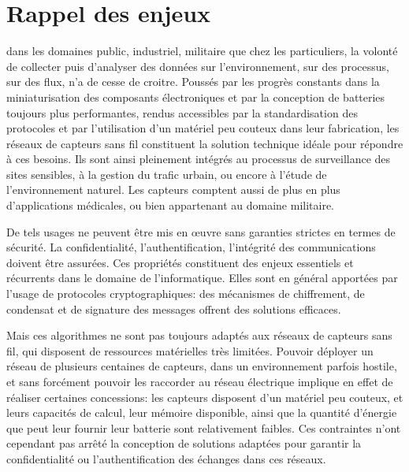 \section{Rappel des enjeux}

 dans les domaines public, industriel, militaire que chez les particuliers, la volonté de collecter puis d'analyser des données sur l'environnement, sur des processus, sur des flux, n'a de cesse de croitre.
Poussés par les progrès constants dans la miniaturisation des composants électroniques et par la conception de batteries toujours plus performantes, rendus accessibles par la standardisation des protocoles et par l'utilisation d'un matériel peu couteux dans leur fabrication, les réseaux de capteurs sans fil constituent la solution technique idéale pour répondre à ces besoins.
Ils sont ainsi pleinement intégrés au processus de surveillance des sites sensibles, à la gestion du trafic urbain, ou encore à l'étude de l'environnement naturel.
Les capteurs comptent aussi de plus en plus d'applications médicales, ou bien appartenant au domaine militaire.

De tels usages ne peuvent être mis en œuvre sans garanties strictes en termes de sécurité.
La confidentialité, l'authentification, l'intégrité des communications doivent être assurées.
Ces propriétés constituent des enjeux essentiels et récurrents dans le domaine de l'informatique.
Elles sont en général apportées par l'usage de protocoles cryptographiques: des mécanismes de chiffrement, de condensat et de signature des messages offrent des solutions efficaces.

Mais ces algorithmes ne sont pas toujours adaptés aux réseaux de capteurs sans fil, qui disposent de ressources matérielles très limitées.
Pouvoir déployer un réseau de plusieurs centaines de capteurs, dans un environnement parfois hostile, et sans forcément pouvoir les raccorder au réseau électrique implique en effet de réaliser certaines concessions: les capteurs disposent d'un matériel peu couteux, et leurs capacités de calcul, leur mémoire disponible, ainsi que la quantité d'énergie que peut leur fournir leur batterie sont relativement faibles.
Ces contraintes n'ont cependant pas arrêté la conception de solutions adaptées pour garantir la confidentialité ou l'authentification des échanges dans ces réseaux.

